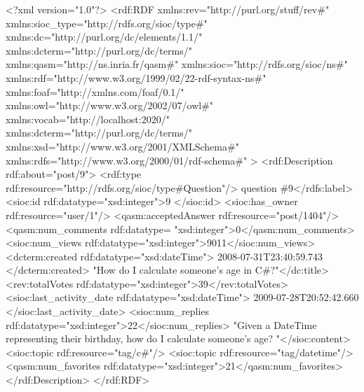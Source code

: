 \begin{algorithm}[h]%
\begin{algorithmic}[1]
\State <?xml version="1.0"?>
\State <rdf:RDF
\State \indent xmlns:rev="http://purl.org/stuff/rev\#"
\State \indent xmlns:sioc\_type="http://rdfs.org/sioc/type\#"
\State \indent xmlns:dc="http://purl.org/dc/elements/1.1/"
\State \indent xmlns:dcterm="http://purl.org/dc/terms/"
\State \indent xmlns:qasm="http://ns.inria.fr/qasm\#"
\State \indent xmlns:sioc="http://rdfs.org/sioc/ns\#"
\State \indent xmlns:rdf="http://www.w3.org/1999/02/22-rdf-syntax-ns\#"
\State \indent xmlns:foaf="http://xmlns.com/foaf/0.1/"
\State \indent xmlns:owl="http://www.w3.org/2002/07/owl\#"
\State \indent xmlns:vocab="http://localhost:2020/"
\State \indent xmlns:dcterm="http://purl.org/dc/terms/"
\State \indent xmlns:xsd="http://www.w3.org/2001/XMLSchema\#"
\State \indent xmlns:rdfs="http://www.w3.org/2000/01/rdf-schema\#"
\State >
\State \indent <rdf:Description rdf:about="post/9">
\State \indent \indent     <rdf:type rdf:resource="http://rdfs.org/sioc/type\#Question"/>
\State \indent {}question \#9</rdfs:label>
\State \indent \indent     <sioc:id rdf:datatype="xsd:integer">9 </sioc:id>
\State \indent \indent     <sioc:has\_owner rdf:resource="user/1"/>
\State \indent \indent     <qasm:acceptedAnswer rdf:resource="post/1404"/>
\State \indent \indent     <qasm:num\_comments rdf:datatype= "xsd:integer">0</qasm:num\_comments>
\State \indent \indent     <sioc:num\_views rdf:datatype="xsd:integer">9011</sioc:num\_views>
\State \indent \indent     <dcterm:created rdf:datatype="xsd:dateTime"> 2008-07-31T23:40:59.743 </dcterm:created>
\State \indent {}"How do I calculate someone's age in C\#?"</dc:title>
\State \indent \indent     <rev:totalVotes rdf:datatype="xsd:integer">39</rev:totalVotes>
\State \indent \indent     <sioc:last\_activity\_date rdf:datatype="xsd:dateTime"> 2009-07-28T20:52:42.660 </sioc:last\_activity\_date>
\State \indent \indent     <sioc:num\_replies rdf:datatype="xsd:integer">22</sioc:num\_replies>
\State \indent {}"Given a DateTime representing their birthday, how do I calculate someone's age? "</sioc:content>
\State \indent \indent     <sioc:topic rdf:resource="tag/c\#"/>
\State \indent \indent     <sioc:topic rdf:resource="tag/datetime"/>
\State \indent \indent     <qasm:num\_favorites rdf:datatype="xsd:integer">21</qasm:num\_favorites>
\State \indent   </rdf:Description>
\State </rdf:RDF>
\end{algorithmic}
\end{algorithm}








